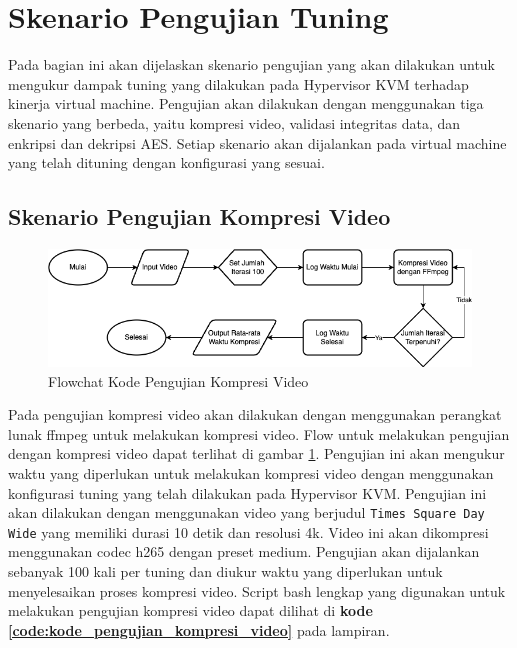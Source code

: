 \section{Skenario Pengujian Tuning}
Pada bagian ini akan dijelaskan skenario pengujian yang akan dilakukan untuk mengukur dampak tuning yang dilakukan pada Hypervisor KVM terhadap kinerja virtual machine. Pengujian akan dilakukan dengan menggunakan tiga skenario yang berbeda, yaitu kompresi video, validasi integritas data, dan enkripsi dan dekripsi AES. Setiap skenario akan dijalankan pada virtual machine yang telah dituning dengan konfigurasi yang sesuai.

\subsection{Skenario Pengujian Kompresi Video}
\begin{figure}
    \centering
    \includegraphics[width=1\textwidth]
    {assets/pics/code-flowchart/flowchart_kompresi_video.png}
    \caption{Flowchat Kode Pengujian Kompresi Video}
    \label{fig:flowchart_kompresi_video}
\end{figure}

Pada pengujian kompresi video akan dilakukan dengan menggunakan perangkat lunak ffmpeg untuk melakukan kompresi video. Flow untuk melakukan pengujian dengan kompresi video dapat terlihat di gambar \ref{fig:flowchart_kompresi_video}. Pengujian ini akan mengukur waktu yang diperlukan untuk melakukan kompresi video dengan menggunakan konfigurasi tuning yang telah dilakukan pada Hypervisor KVM. Pengujian ini akan dilakukan dengan menggunakan video yang berjudul \texttt{Times Square Day Wide} yang memiliki durasi 10 detik dan resolusi 4k. Video ini akan dikompresi menggunakan codec h265 dengan preset medium. Pengujian akan dijalankan sebanyak 100 kali per tuning dan diukur waktu yang diperlukan untuk menyelesaikan proses kompresi video. Script bash lengkap yang digunakan untuk melakukan pengujian kompresi video dapat dilihat di \textbf{kode \ref{code:kode_pengujian_kompresi_video}} pada lampiran.


